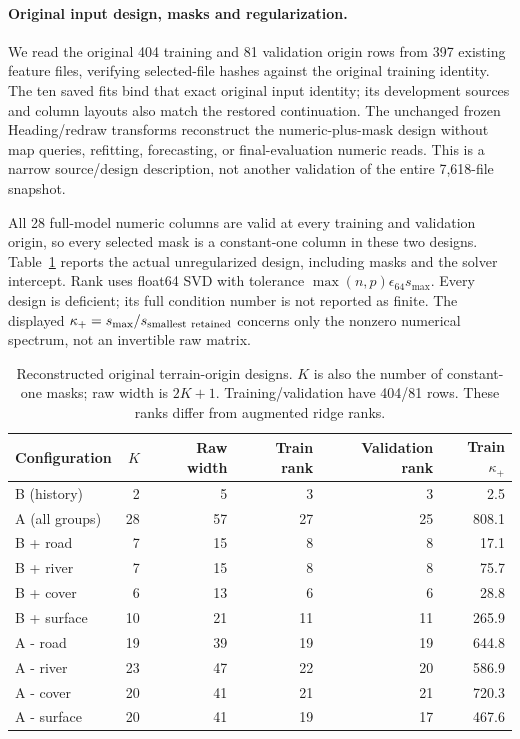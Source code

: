 \paragraph{Original input design, masks and regularization.}
We read the original 404 training and 81 validation origin rows from 397
existing feature files, verifying selected-file hashes against the original
training identity. The ten saved fits bind that exact original input
identity; its development sources and column layouts also match the restored
continuation. The unchanged frozen Heading/redraw transforms reconstruct the
numeric-plus-mask design without map queries, refitting, forecasting, or
final-evaluation numeric reads. This is a narrow source/design description,
not another validation of the entire 7,618-file snapshot.

All 28 full-model numeric columns are valid at every training and validation
origin, so every selected mask is a constant-one column in these two designs.
Table~\ref{tab:raw-terrain-design} reports the actual unregularized design,
including masks and the solver intercept. Rank uses float64 SVD with
tolerance \(\max(n,p)\epsilon_{64}s_{\max}\). Every design is deficient;
its full condition number is not reported as finite. The displayed
\(\kappa_{+}=s_{\max}/s_{\rm smallest\ retained}\) concerns only the
nonzero numerical spectrum, not an invertible raw matrix.

\begin{table}[htbp]
\centering\small
\caption{Reconstructed original terrain-origin designs. \(K\) is also the
number of constant-one masks; raw width is \(2K+1\). Training/validation
have 404/81 rows. These ranks differ from augmented ridge ranks.}
\label{tab:raw-terrain-design}\hypertarget{tab:raw-terrain-design}{}
\begin{tabular}{lrrrrr}
\toprule
Configuration & \(K\) & Raw width & Train rank & Validation rank & Train \(\kappa_{+}\)\\
\midrule
B (history) & 2 & 5 & 3 & 3 & 2.5\\
A (all groups) & 28 & 57 & 27 & 25 & 808.1\\
B + road & 7 & 15 & 8 & 8 & 17.1\\
B + river & 7 & 15 & 8 & 8 & 75.7\\
B + cover & 6 & 13 & 6 & 6 & 28.8\\
B + surface & 10 & 21 & 11 & 11 & 265.9\\
A - road & 19 & 39 & 19 & 19 & 644.8\\
A - river & 23 & 47 & 22 & 20 & 586.9\\
A - cover & 20 & 41 & 21 & 21 & 720.3\\
A - surface & 20 & 41 & 19 & 17 & 467.6\\
\bottomrule
\end{tabular}
\end{table}

